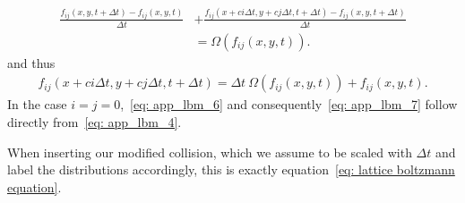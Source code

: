 \begin{equation}
  \label{eq: app_lbm_6}
  \begin{aligned}
    \frac{f_{ij}(x,y, t+\Delta t) - f_{ij}(x,y, t)}{\Delta t}
    & + \frac{f_{ij}\left(x + ci\Delta t, y+ cj\Delta t, t+\Delta t\right) - f_{ij}(x,y, t+\Delta t)}{\Delta t}
    \\&
    = \Omega\left(f_{ij}(x,y,t)\right).
  \end{aligned}
\end{equation}
and thus
\begin{equation}
  \label{eq: app_lbm_7}
  \begin{aligned}
    f_{ij}\left(x + ci\Delta t, y+ cj\Delta t, t+\Delta t\right)
    = \Delta t\ \Omega\left(f_{ij}(x,y,t)\right) + f_{ij}(x,y, t).
  \end{aligned}
\end{equation}
In the case $i=j=0$,~\eqref{eq: app_lbm_6} and consequently~\eqref{eq: app_lbm_7} follow directly from~\eqref{eq: app_lbm_4}.

When inserting our modified collision, which we assume to be scaled with $\Delta t$ and label the distributions accordingly, this is exactly equation~\eqref{eq: lattice boltzmann equation}.
